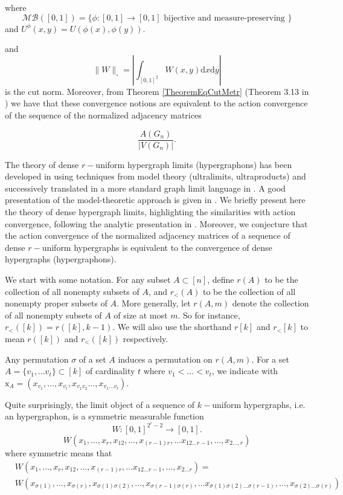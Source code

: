 \documentclass[11pt]{article}
\begin{document}
where 
$$\mathcal{MB}([0,1])=\{\phi:[0,1]\rightarrow[0,1] \text{ bijective and measure-preserving }\}$$
  and $U^{\phi}(x,y)=U(\phi(x),\phi(y))$.

  and 
$$\|W\|_{\square}=|\int_{[0,1]^2}W(x,y)\mathrm{d}x\mathrm{d}y|$$ 
is the cut norm. Moreover, from Theorem \ref{TheoremEqCutMetr} (Theorem 3.13 in \cite{backhausz2018action}) we have that these convergence notions are equivalent to the action convergence of the sequence of the normalized adjacency matrices 

$$
\frac{A(G_n)}{|V(G_n)|}.
$$

The theory of dense $r-$uniform hypergraph limits (hypergraphons) has been developed in \cite{hypergrELEK20121731} using techniques from model theory (ultralimits, ultraproducts) and successively translated in a more standard graph limit  language in \cite{HypergraphonsZhao}. A good presentation of the model-theoretic approach is given in \cite{RandomneLimitTow}. We briefly present here the theory of dense hypergraph limits, highlighting the similarities with action convergence, following the analytic presentation in \cite{HypergraphonsZhao}. Moreover, we conjecture that the action convergence of the normalized adjacency matrices of a sequence of dense $r-$uniform hypergraphs is equivalent to the convergence of dense hypergraphs (hypergraphons).

We start with some notation. For any subset $A\subset [n]$, define $r(A)$ to be the collection of all nonempty subsets of $A$, and $r_{<}(A)$ to be the collection of all nonempty proper subsets of $A$. More generally, let $r(A, m)$ denote the collection of all nonempty subsets of $A$ of size at most $m$. So for instance, $r_{<}([k])=r([k], k-1)$. We will also use the shorthand $r[k]$ and $r_{<}[k]$ to mean $r([k])$ and $r_{<}([k])$ respectively.

Any permutation $\sigma$ of a set $A$ induces a permutation on $r(A, m)$. For a set $A=\{v_1,\ldots v_t\}\subset [k]$ of cardinality $t$ where $v_1<\ldots <v_t$, we indicate with $\mathrm{x}_A=(x_{v_1},\ldots,x_{v_t},x_{v_1v_2}\ldots,x_{v_1\ldots v_t} )$.   %

Quite surprisingly, the limit object of a sequence of $k-$uniform hypergraphs, i.e. an hypergraphon, is a symmetric measurable function
$$
W:[0,1]^{2^r-2}\longrightarrow [0,1].
$$
$$
W(x_1,\ldots, x_r,x_{12},\ldots,x_{(r-1)r},\ldots x_{12\ldots r-1},\ldots,x_{2\ldots,r})
$$
where symmetric means that 
\begin{equation*}
\begin{aligned}
   & W(x_1,\ldots, x_r,x_{12},\ldots,x_{(r-1)r},\ldots x_{12\ldots r-1},\ldots,x_{2\ldots r})=\\
  &  W(x_{\sigma(1)},\ldots, x_{\sigma{(r)}},x_{\sigma{(1)}\sigma{(2)}},\ldots,x_{\sigma(r-1)\sigma(r)},\ldots x_{\sigma(1)\sigma(2)\ldots \sigma(r-1)},\ldots,x_{\sigma(2)\ldots \sigma(r)})
    \end{aligned}
\end{equation*}
\end{document}
